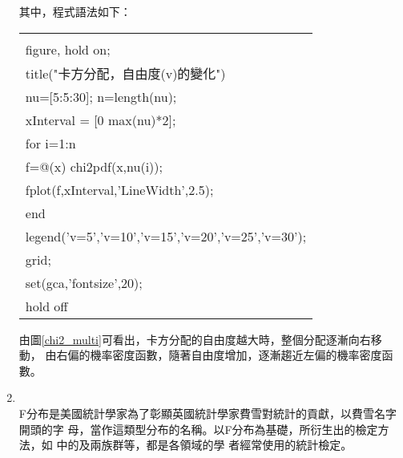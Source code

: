 \begin{enumerate}
{					其中，程式語法如下：
					\begin{center}\colorbox{slight}{
						\begin{tabular}{p{}}
							\MJHmarker{\textbf{\color{darkblue}{MATLAB語法 :}}}\\		
							figure, hold on; \\
    						title("卡方分配，自由度(v)的變化")\\
    						nu=[5:5:30]; n=length(nu);\\
   							xInterval = [0 max(nu)*2];\\
   							for i=1:n\\
     						\quad	f=@(x) chi2pdf(x,nu(i));   \\      
     						\quad    fplot(f,xInterval,'LineWidth',2.5);  \\       
   							end \\
   							legend('v=5','v=10','v=15','v=20','v=25','v=30');\\
   							grid;        \\
   							set(gca,'fontsize',20); \\
   							hold off\\
						\end{tabular}
					}
					\end{center}
					由圖\ref{chi2_multi}可看出，卡方分配的自由度越大時，整個分配逐漸向右移動，						由右偏的機率密度函數，隨著自由度增加，逐漸趨近左偏的機率密度函數。
										
				}				
				\item{\textbf{}\\
					F分布是美國統計學家為了彰顯英國統計學家費雪對統計的貢獻，以費雪名字開頭的字						母，當作這類型分布的名稱。以F分布為基礎，所衍生出的檢定方法，如									\textbf{\color{darkblue}{變方分析}}中的\textbf{\color{darkblue}{F檢						定}}及兩族群\textbf{\color{darkblue}{變方相等性檢定}}等，都是各領域的學						者經常使用的統計檢定。\\
					
}
\end{enumerate}

